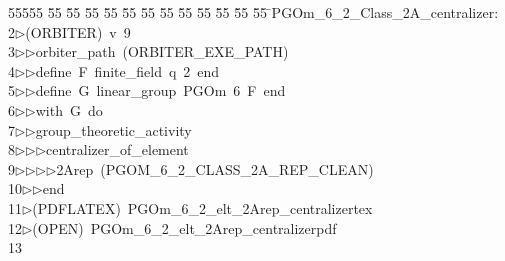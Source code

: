 %
%
\begin{tabbing}
55555 \= 55 \= 55 \= 55 \= 55 \= 55 \= 55 \= 55 \= 55 \= 55 \= 55 \= 55 \= 55 \= \>PGOm\_6\_2\_Class\_2A\_centralizer:\\[0pt]
2\>$\triangleright$\>(ORBITER)\ v\ 9\ \\[0pt]
3\>$\triangleright$\>$\triangleright$\>orbiter\_path\ (ORBITER\_EXE\_PATH)\ \\[0pt]
4\>$\triangleright$\>$\triangleright$\>define\ F\ finite\_field\ q\ 2\ end\ \\[0pt]
5\>$\triangleright$\>$\triangleright$\>define\ G\ linear\_group\ PGOm\ 6\ F\ end\ \\[0pt]
6\>$\triangleright$\>$\triangleright$\>with\ G\ do\ \\[0pt]
7\>$\triangleright$\>$\triangleright$\>group\_theoretic\_activity\ \\[0pt]
8\>$\triangleright$\>$\triangleright$\>$\triangleright$\>centralizer\_of\_element\ \\[0pt]
9\>$\triangleright$\>$\triangleright$\>$\triangleright$\>$\triangleright$\>2Arep\ (PGOM\_6\_2\_CLASS\_2A\_REP\_CLEAN)\ \\[0pt]
10\>$\triangleright$\>$\triangleright$\>end\\[0pt]
11\>$\triangleright$\>(PDFLATEX)\ PGOm\_6\_2\_elt\_2Arep\_centralizertex\\[0pt]
12\>$\triangleright$\>(OPEN)\ PGOm\_6\_2\_elt\_2Arep\_centralizerpdf\\[0pt]
13\>\end{tabbing}
